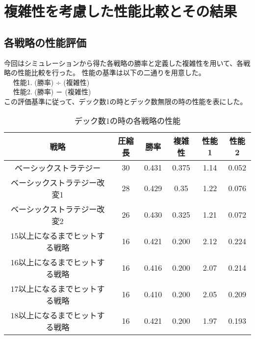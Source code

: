 \section{複雑性を考慮した性能比較とその結果}

\subsection{各戦略の性能評価}

今回はシミュレーションから得た各戦略の勝率と定義した複雑性を用いて、各戦略の性能比較を行った。
性能の基準は以下の二通りを用意した。\\
~~ 性能1. (勝率) ÷ (複雑性)\\
~~ 性能2. (勝率) － (複雑性)\\
この評価基準に従って、デック数1の時とデック数無限の時の性能を表にした。




\begin{table}[H]
\caption{デック数1の時の各戦略の性能}
\label{table:data_type}
\begin{center}
\begin{tabular}{|c|c|c|c|c|c|}
\hline
戦略           & 圧縮長 & 勝率    & 複雑性   & 性能1  & 性能2   \\ \hline
ベーシックストラテジー         & 30  & 0.431 & 0.375 & 1.14 & 0.052 \\ \hline
ベーシックストラテジー改変1      & 28  & 0.429 & 0.35  & 1.22 & 0.076 \\ \hline
ベーシックストラテジー改変2      & 26  & 0.430 & 0.325 & 1.21 & 0.072 \\ \hline
15以上になるまでヒットする戦略 & 16  & 0.421 & 0.200 & 2.12 & 0.224 \\ \hline
16以上になるまでヒットする戦略 & 16  & 0.416 & 0.200 & 2.07 & 0.214 \\ \hline
17以上になるまでヒットする戦略 & 16  & 0.410 & 0.200 & 2.05 & 0.209 \\ \hline
18以上になるまでヒットする戦略 & 16  & 0.421 & 0.200 & 1.97 & 0.193 \\ \hline
\end{tabular}
\end{center}
\end{table}


